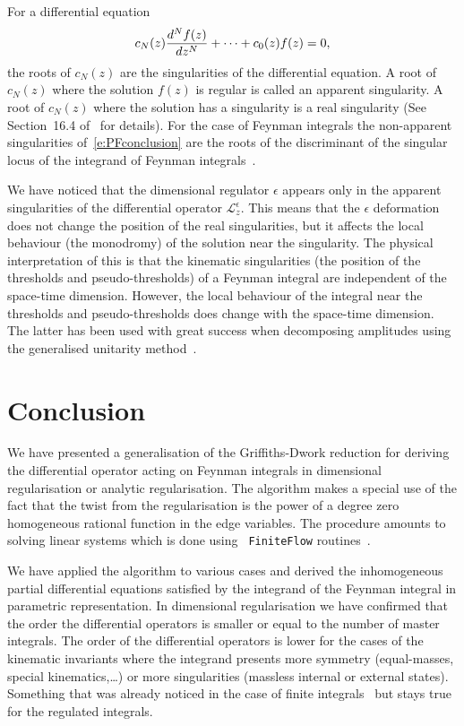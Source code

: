 \documentclass[a4paper,12pt]{article}
\numberwithin{equation}{section}
\numberwithin{figure}{section}
\begin{document}
%
For a differential equation
\begin{equation}\label{e:PFconclusion}
c_N(z)  {d^Nf(z)\over dz^N}+\cdots + c_0(z) f(z)=0,
\end{equation}
the roots of $c_N(z)$ are the singularities of the differential
equation. A root of $c_N(z)$ where the solution $f(z)$ is
regular is called an apparent singularity. A root of $c_N(z)$
where the solution has a singularity is a real singularity (See 
Section~16.4 of~\cite{Ince} for details). 
%
For the case of Feynman integrals the non-apparent singularities
of~\eqref{e:PFconclusion} are the roots of the
discriminant of the singular locus of the integrand of  Feynman
integrals~\cite{Doran:2023yzu}.

We have noticed that the dimensional regulator $\epsilon$ appears only in  the
apparent singularities of the differential operator
$\mathscr{L}_z^\epsilon$. This means that the  $\epsilon$ deformation
does not change the position of the real singularities, but it affects
the local behaviour (the monodromy) of the solution near the
singularity.
%
The physical interpretation of this is that the kinematic
singularities (the position of the thresholds
and pseudo-thresholds) of a Feynman integral are independent of the
space-time dimension. However,  the local behaviour of the integral near
the thresholds and pseudo-thresholds does change with the space-time
dimension. The latter has been used with great success
when decomposing amplitudes using the generalised unitarity method~\cite{Bern:2011qt}.

\section{Conclusion}\label{sec:conclusion}
We have presented a generalisation of the Griffiths-Dwork reduction
for deriving the differential operator acting on Feynman integrals in
dimensional regularisation or analytic regularisation. The algorithm
makes a special use of the fact that the twist from the regularisation
is the power of a degree zero homogeneous rational function in the
edge variables. The procedure amounts to
solving linear systems which is done using {\tt
  FiniteFlow} routines~\cite{Peraro:2019svx}.

We have applied the algorithm to various cases and derived the
inhomogeneous partial differential equations satisfied by the integrand of the Feynman integral in parametric representation.
In dimensional regularisation we have confirmed that the order the
differential operators is smaller or equal to the number of master
integrals. The order of the differential operators is lower for the cases of the kinematic invariants where the integrand
presents more symmetry (equal-masses, special kinematics,\dots) or
more singularities (massless internal or external states). Something
that was already noticed in the case of finite integrals~\cite{Lairez:2022zkj}  but stays
true for the regulated integrals.
\end{document}
